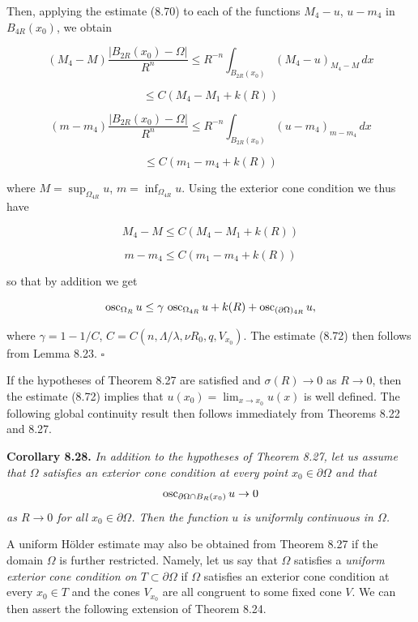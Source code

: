 Then, applying the estimate (8.70) to each of the functions $M_4-u$, $u-m_4$ in $B_{4R}(x_0)$, we obtain

\[
(M_4-M)\frac{|B_{2R}(x_0)-\Omega|}{R^n} \le R^{-n}\int_{B_{2R}(x_0)} (M_4-u)_{M_4-M}\,dx
\]

\[
\le C(M_4-M_1+k(R))
\]

\[
(m-m_4)\frac{|B_{2R}(x_0)-\Omega|}{R^n} \le R^{-n}\int_{B_{2R}(x_0)} (u-m_4)_{m-m_4}\,dx
\]

\[
\le C(m_1-m_4+k(R))
\]

where $M = \sup_{\Omega_{4R}}u$, $m = \inf_{\Omega_{4R}}u$. Using the exterior cone condition we thus have

\[
M_4-M \le C(M_4-M_1+k(R))
\]

\[
m-m_4 \le C(m_1-m_4+k(R))
\]

so that by addition we get

\[
\operatorname{osc}_{\Omega_R} u \le \gamma\,\operatorname{osc}_{\Omega_{4R}}u + k(R) + \operatorname{osc}_{(\partial\Omega)_{4R}}u,
\]

where $\gamma = 1-1/C$, $C = C(n,\Lambda/\lambda,\nu R_0,q,V_{x_0})$. The estimate (8.72) then follows from Lemma 8.23. $\square$

If the hypotheses of Theorem 8.27 are satisfied and $\sigma(R) \to 0$ as $R \to 0$, then the estimate (8.72) implies that $u(x_0) = \lim_{x \to x_0} u(x)$ is well defined. The following global continuity result then follows immediately from Theorems 8.22 and 8.27.


\noindent \textbf{Corollary 8.28.} \emph{In addition to the hypotheses of Theorem 8.27, let us assume that $\Omega$ satisfies an exterior cone condition at every point $x_0 \in \partial\Omega$ and that}
\[
\operatorname{osc}_{\partial\Omega \cap B_R(x_0)} u \to 0
\]
\emph{as $R \to 0$ for all $x_0 \in \partial\Omega$. Then the function $u$ is uniformly continuous in $\Omega$.}

\medskip

A uniform H\"older estimate may also be obtained from Theorem 8.27 if the domain $\Omega$ is further restricted. Namely, let us say that $\Omega$ satisfies a \emph{uniform exterior cone condition on $T \subset \partial\Omega$} if $\Omega$ satisfies an exterior cone condition at every $x_0 \in T$ and the cones $V_{x_0}$ are all congruent to some fixed cone $V$. We can then assert the following extension of Theorem 8.24.

\medskip


